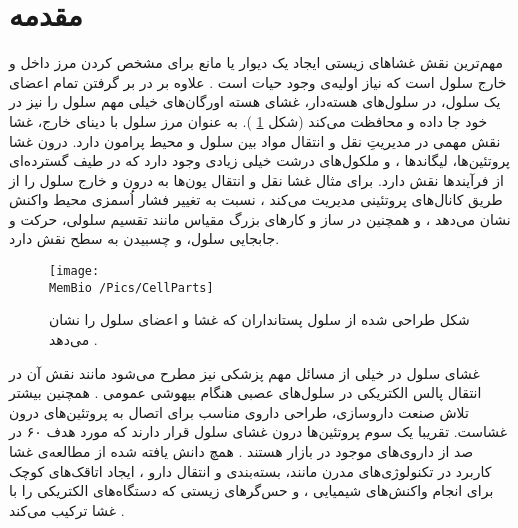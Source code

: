 \setRL


\section{
مقدمه
}
مهم‌ترین نقش غشاهای زیستی ایجاد یک دیوار یا مانع برای مشخص کردن مرز داخل و خارج سلول است که نیاز اولیه‌ی وجود حیات است
\cite{Boyle2008Biology}.
 علاوه بر در بر گرفتن تمام اعضای یک سلول، در سلول‌های هسته‌دار، غشای هسته اورگان‌های خیلی مهم سلول را نیز در خود جا داده و محافظت می‌کند (شکل
\ref{fig:cellparts}
). به عنوان مرز سلول با دینای خارج، غشا نقش مهمی در مدیریتِ نقل و انتقال مواد بین سلول و محیط پرامون دارد. درون غشا پروتئین‌ها، لیگاند‌ها
،
و ملکول‌های درشت خیلی زیادی وجود دارد که در طیف‌ گسترده‌ای از فرآیندها نقش دارد. برای مثال غشا نقل و انتقال یون‌ها به درون و خارج سلول را از طریق کانال‌های پروتئینی مدیریت می‌کند
\cite{NEHER1976ProteinChannel}،
نسبت به تغییر فشار اُسمزی محیط واکنش نشان می‌دهد
\cite{Perozo2006Osmotic,Vasquez2009Osmotic,Haswell2011Osmotic}،
و همچنین در ساز و کار‌های بزرگ مقیاس مانند تقسیم سلولی، حرکت و جابجایی سلول، و چسبیدن به سطح نقش دارد.
\begin{figure}[h]
\begin{center}
\texttt{[image: \\MemBio /Pics/CellParts]}
\caption{
شکل طراحی شده از سلول پستانداران که غشا و اعضای سلول را نشان می‌دهد
\cite{CellParts}
.
}
\label{fig:cellparts}
\end{center}
\end{figure}


غشای سلول در خیلی از مسائل مهم پزشکی نیز مطرح می‌شود مانند نقش آن در انتقال پالس الکتریکی در سلول‌های عصبی هنگام بیهوشی عمومی 
\cite{BioMemBook2007}.
همچنین بیشتر تلاش صنعت داروسازی، طراحی داروی مناسب برای اتصال به پروتئین‌های درون غشاست. تقریبا یک سوم پروتئین‌ها درون غشای سلول قرار دارند که  مورد هدف ۶۰ در صد از داروی‌های موجود در بازار هستند
\cite{DrugDelivery2007}.
همچ دانش یافته شده از مطالعه‌ی غشا کاربرد در تکنولوژی‌های مدرن مانند، بسته‌بندی و انتقال دارو
\cite{Torchilin2006Drugdelivery}،
ایجاد اتاقک‌های کوچک برای انجام واکنش‌های شیمیایی
\cite{Karlsson2001MemChamber}،
 و حس‌گرهای زیستی که دستگاه‌های الکتریکی را با غشا ترکیب می‌کند
\cite{MemeElctronics2012}.


